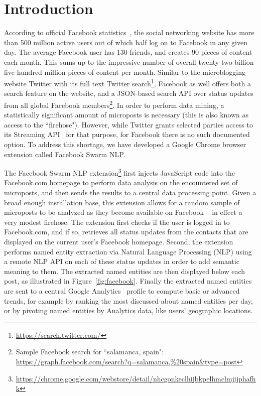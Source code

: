 \documentclass[conference]{IEEEtran}
\begin{document}
\IEEEpeerreviewmaketitle

\section{Introduction}                                                      \label{sec:introduction}
According to official Facebook statistics~\cite{Facebook}, the social networking website has more than 500 million active users out of which half log on to Facebook in any given day. The average Facebook user has 130 friends, and creates 90 pieces of content each month. This sums up to the impressive number of overall twenty-two billion five hundred million pieces of content per month. Similar to the microblogging website Twitter with its full text Twitter search\footnote{\url{https://search.twitter.com/}}, Facebook as well offers both a search feature on the website, and a JSON-based search API over status updates from all global Facebook members\footnote{Sample Facebook search for ``salamanca, spain": \url{https://graph.facebook.com/search?q=salamanca,\%20spain&type=post}}. In order to perform data mining, a statistically significant amount of microposts is necessary (this is also known as access to the ``firehose"). However, while Twitter grants selected parties access to its Streaming API~\cite{Twitter} for that purpose, for Facebook there is no such documented option. To address this shortage, we have developed a Google Chrome browser extension called Facebook Swarm NLP.

The Facebook Swarm NLP extension\footnote{\url{https://chrome.google.com/webstore/detail/nhcgonkeclhijbkpelhmclmjijphafhk}} first injects JavaScript code into the Facebook.com homepage to perform data analysis on the encountered set of microposts, and then sends the results to a central data processing point. Given a broad enough installation base, this extension allows for a random sample of microposts to be analyzed as they become available on Facebook -- in effect a very modest firehose. The extension first checks if the user is logged in to Facebook.com, and if so, retrieves all status updates from the contacts that are displayed on the current user's Facebook homepage. Second, the extension performs named entity extraction via Natural Language Processing (NLP) using a remote NLP API on each of these status updates in order to add semantic meaning to them. The extracted named entities are then displayed below each post, as illustrated in Figure~\ref{fig:facebook}. Finally the extracted named entities are sent to a central Google Analytics~\cite{Kaushik} profile to compute basic or advanced trends, for example by ranking the most discussed-about named entities per day, or by pivoting named entities by Analytics data, like users' geographic locations.
\end{document}
